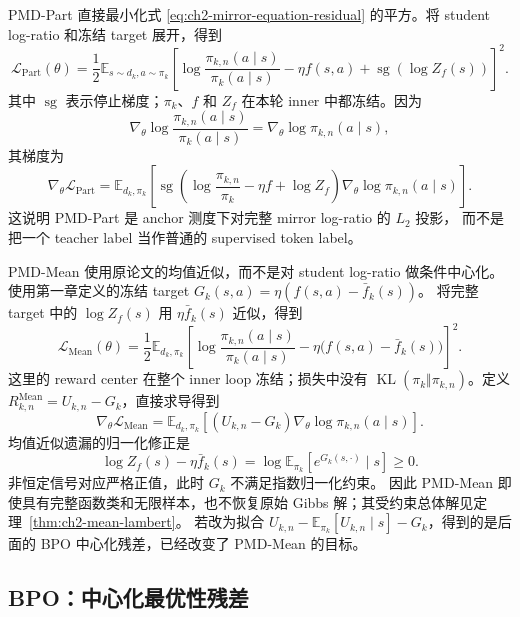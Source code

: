 PMD-Part 直接最小化式 \eqref{eq:ch2-mirror-equation-residual} 的平方。将
student log-ratio 和冻结 target 展开，得到
\begin{equation}
\label{eq:ch2-regression-from-mirror}
\mathcal L_{\mathrm{Part}}(\theta)
=\frac12\mathbb E_{s\sim d_k,a\sim\pi_k}
\left[
\log\frac{\pi_{k,n}(a\mid s)}{\pi_k(a\mid s)}
-\eta f(s,a)+\operatorname{sg}\!\left(\log Z_f(s)\right)
\right]^2.
\end{equation}
其中 $\operatorname{sg}$ 表示停止梯度；$\pi_k$、$f$ 和 $Z_f$ 在本轮
inner 中都冻结。因为
\[
\nabla_\theta\log\frac{\pi_{k,n}(a\mid s)}{\pi_k(a\mid s)}
=\nabla_\theta\log\pi_{k,n}(a\mid s),
\]
其梯度为
\begin{equation}
\nabla_\theta\mathcal L_{\mathrm{Part}}
=\mathbb E_{d_k,\pi_k}
\left[\operatorname{sg}\!\left(
\log\frac{\pi_{k,n}}{\pi_k}-\eta f+\log Z_f
\right)\nabla_\theta\log\pi_{k,n}(a\mid s)\right].
\label{eq:ch2-part-gradient-bridge}
\end{equation}
这说明 PMD-Part 是 anchor 测度下对完整 mirror log-ratio 的 $L_2$ 投影，
而不是把一个 teacher label 当作普通的 supervised token label。

PMD-Mean 使用原论文的均值近似，而不是对 student log-ratio 做条件中心化。使用第一章定义的冻结 target $G_k(s,a)=\eta(f(s,a)-\bar f_k(s))$。
将完整 target 中的 $\log Z_f(s)$ 用 $\eta\bar f_k(s)$ 近似，得到
\begin{equation}
\mathcal L_{\mathrm{Mean}}(\theta)
=\frac12\mathbb E_{d_k,\pi_k}
\left[\log\frac{\pi_{k,n}(a\mid s)}{\pi_k(a\mid s)}
-\eta\bigl(f(s,a)-\bar f_k(s)\bigr)\right]^2.
\label{eq:ch2-mean-loss-bridge}
\end{equation}
这里的 reward center 在整个 inner loop 冻结；损失中没有
$\operatorname{KL}(\pi_k\Vert\pi_{k,n})$。定义 $R_{k,n}^{\mathrm{Mean}}=U_{k,n}-G_k$，直接求导得到
\begin{equation}
\nabla_\theta\mathcal L_{\mathrm{Mean}}
=\mathbb E_{d_k,\pi_k}
\left[(U_{k,n}-G_k)\nabla_\theta\log\pi_{k,n}(a\mid s)\right].
\label{eq:ch2-mean-gradient-bridge}
\end{equation}
均值近似遗漏的归一化修正是
\[
\log Z_f(s)-\eta\bar f_k(s)
=\log\mathbb E_{\pi_k}[e^{G_k(s,\cdot)}\mid s]\ge0.
\]
非恒定信号对应严格正值，此时 $G_k$ 不满足指数归一化约束。
因此 PMD-Mean 即使具有完整函数类和无限样本，也不恢复原始 Gibbs 解；其受约束总体解见定理~\ref{thm:ch2-mean-lambert}。
若改为拟合 $U_{k,n}-\mathbb E_{\pi_k}[U_{k,n}\mid s]-G_k$，得到的是后面的 BPO 中心化残差，已经改变了 PMD-Mean 的目标。

\subsection{BPO：中心化最优性残差}
\label{subsec:ch2-bpo-loss-derivation}

